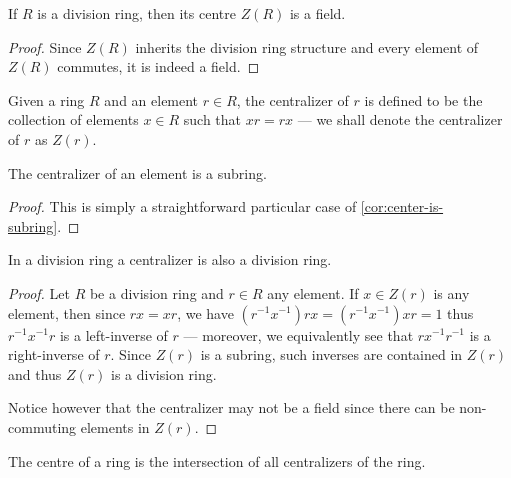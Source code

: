 %
\begin{corollary}
    \label{cor:division-ring-center-is-field}
    If \(R\) is a division ring, then its centre \(Z(R)\) is a field.
\end{corollary}
%

%
\begin{proof}
    Since \(Z(R)\) inherits the division ring structure and every element of
    \(Z(R)\) commutes, it is indeed a field.
\end{proof}
%

%
\begin{definition}[Centralizer]
    \label{def:ring-centralizer}
    Given a ring \(R\) and an element \(r \in R\), the centralizer of \(r\) is
    defined to be the collection of elements \(x \in R\) such that \(x r = r x\) ---
    we shall denote the centralizer of \(r\) as \(Z(r)\).
\end{definition}
%

%
\begin{corollary}
    \label{cor:centralizer-is-subring}
    The centralizer of an element is a subring.
\end{corollary}
%

%
\begin{proof}
    This is simply a straightforward particular case of
    \cref{cor:center-is-subring}.
\end{proof}
%

%
\begin{corollary}
    \label{cor:division-ring-centralizer-is-division-ring}
    In a division ring a centralizer is also a division ring.
\end{corollary}
%

%
\begin{proof}
    Let \(R\) be a division ring and \(r \in R\) any element. If \(x \in Z(r)\) is
    any element, then since \(r x = x r\), we have \((r^{-1} x^{-1}) r x = (r^{-1}
    x^{-1}) x r = 1\) thus \(r^{-1} x^{-1} r\) is a left-inverse of \(r\) ---
    moreover, we equivalently see that \(r x^{-1} r^{-1}\) is a right-inverse of
    \(r\). Since \(Z(r)\) is a subring, such inverses are contained in \(Z(r)\) and
    thus \(Z(r)\) is a division ring.

    Notice however that the centralizer may not be a field since there can be
    non-commuting elements in \(Z(r)\).
\end{proof}
%

%
\begin{corollary}
    \label{cor:center-is-intersection-of-all-centralizers}
    The centre of a ring is the intersection of all centralizers of the ring.
\end{corollary}
%

